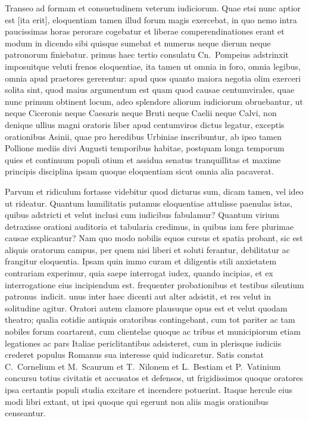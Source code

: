 Transeo ad formam et consuetudinem veterum iudiciorum. Quae etsi nunc aptior est [ita erit], eloquentiam tamen illud forum magis exercebat, in quo nemo intra paucissimas horas perorare cogebatur et liberae comperendinationes erant et modum in dicendo sibi quisque sumebat et numerus neque dierum neque patronorum finiebatur. primus haec tertio consulatu Cn.~Pompeius adstrinxit imposuitque veluti frenos eloquentiae, ita tamen ut omnia in foro, omnia legibus, omnia apud praetores gererentur: apud quos quanto maiora negotia olim exerceri solita sint, quod maius argumentum est quam quod causae centumvirales, quae nunc primum obtinent locum, adeo splendore aliorum iudiciorum obruebantur, ut neque Ciceronis neque Caesaris neque Bruti neque Caelii neque Calvi, non denique ullius magni oratoris liber apud centumviros dictus legatur, exceptis orationibus Asinii, quae pro heredibus Urbiniae inscribuntur, ab ipso tamen Pollione mediis divi Augusti temporibus habitae, postquam longa temporum quies et continuum populi otium et assidua senatus tranquillitas et maxime principis disciplina ipsam quoque eloquentiam sicut omnia alia pacaverat.

Parvum et ridiculum fortasse videbitur quod dicturus sum, dicam tamen, vel ideo ut rideatur. Quantum humilitatis putamus eloquentiae attulisse paenulas istas, quibus adstricti et velut inclusi cum iudicibus fabulamur? Quantum virium detraxisse orationi auditoria et tabularia credimus, in quibus iam fere plurimae causae explicantur? Nam quo modo nobilis equos cursus et spatia probant, sic est aliquis oratorum campus, per quem nisi liberi et soluti ferantur, debilitatur ac frangitur eloquentia. Ipsam quin immo curam et diligentis stili anxietatem contrariam experimur, quia saepe interrogat iudex, quando incipias, et ex interrogatione eius incipiendum est. frequenter probationibus et testibus silentium \textdagger patronus\textdagger\ indicit. unus inter haec dicenti aut alter adsistit, et res velut in solitudine agitur. Oratori autem clamore plausuque opus est et velut quodam theatro; qualia cotidie antiquis oratoribus contingebant, cum tot pariter ac tam nobiles forum coartarent, cum clientelae quoque ac tribus et municipiorum etiam legationes ac pars Italiae periclitantibus adsisteret, cum in plerisque iudiciis crederet populus Romanus sua interesse quid iudicaretur. Satis constat C.~Cornelium et M.~Scaurum et T.~Nilonem et L.~Bestiam et P.~Vatinium concursu totius civitatis et accusatos et defensos, ut frigidissimos quoque oratores ipsa certantis populi studia excitare et incendere potuerint. Itaque hercule eius modi libri extant, ut ipsi quoque qui egerunt non aliis magis orationibus censeantur.

